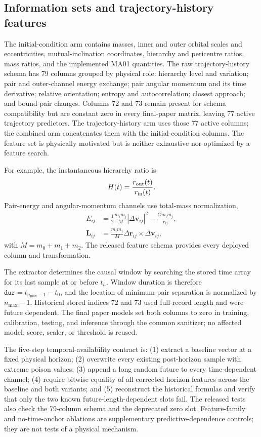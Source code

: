 \documentclass[linenumbers,twocolumn]{aastex702}
\begin{document}
\subsection{Information sets and trajectory-history features}\label{sec:features}

The initial-condition arm contains masses, inner and outer orbital scales and eccentricities, mutual-inclination coordinates, hierarchy and pericentre ratios, mass ratios, and the implemented MA01 quantities. The raw trajectory-history schema has 79 columns grouped by physical role: hierarchy level and variation; pair and outer-channel energy exchange; pair angular momentum and its time derivative; relative orientation; entropy and autocorrelation; closest approach; and bound-pair changes. Columns 72 and 73 remain present for schema compatibility but are constant zero in every final-paper matrix, leaving 77 active trajectory predictors. The trajectory-history arm uses those 77 active columns; the combined arm concatenates them with the initial-condition columns. The feature set is physically motivated but is neither exhaustive nor optimized by a feature search.

For example, the instantaneous hierarchy ratio is
\begin{equation}
 H(t)=\frac{r_{\rm out}(t)}{r_{\rm in}(t)}.
\end{equation}
Pair-energy and angular-momentum channels use total-mass normalization,
\begin{align}
 E_{ij}&=\frac{1}{2}\frac{m_i m_j}{M}|\Delta\boldsymbol{v}_{ij}|^2
       -\frac{Gm_i m_j}{r_{ij}},\\
 \boldsymbol{L}_{ij}&=\frac{m_i m_j}{M}
       \Delta\boldsymbol{r}_{ij}\times\Delta\boldsymbol{v}_{ij},
\end{align}
with $M=m_0+m_1+m_2$. The released feature schema provides every deployed column and transformation.

The extractor determines the causal window by searching the stored time array for its last sample at or before $t_h$. Window duration is therefore $\mathtt{dur}=t_{n_{\max}-1}-t_0$, and the location of minimum pair separation is normalized by $n_{\max}-1$. Historical stored indices 72 and 73 used full-record length and were future dependent. The final paper models set both columns to zero in training, calibration, testing, and inference through the common sanitizer; no affected model, score, scaler, or threshold is reused.

The five-step temporal-availability contract is: (1) extract a baseline vector at a fixed physical horizon; (2) overwrite every existing post-horizon sample with extreme poison values; (3) append a long random future to every time-dependent channel; (4) require bitwise equality of all corrected horizon features across the baseline and both variants; and (5) reconstruct the historical formulas and verify that only the two known future-length-dependent slots fail. The released tests also check the 79-column schema and the deprecated zero slot. Feature-family and no-time-anchor ablations are supplementary predictive-dependence controls; they are not tests of a physical mechanism.
\end{document}
